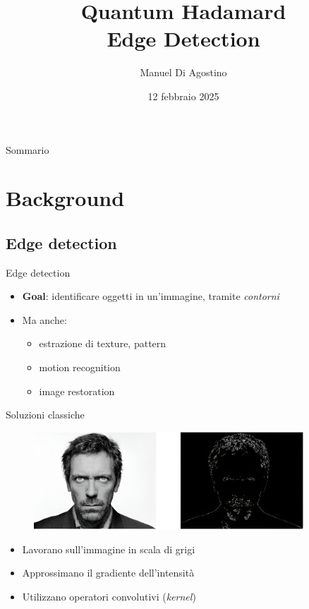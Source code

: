 \documentclass{beamer}
\title{Quantum Hadamard\\Edge Detection}
\author{Manuel Di Agostino}
\institute{Università di Parma}
\date{12 febbraio 2025}
\begin{document}
	\begin{frame}
		\titlepage
	\end{frame}
	\begin{frame}{Sommario}
		\tableofcontents
	\end{frame}
	
	\section{Background}


	\subsection{Edge detection}

	\begin{frame}{Edge detection}
		\begin{itemize}
			\item \textbf{Goal}: identificare oggetti in un'immagine, tramite
			\emph{contorni}
			\item Ma anche:
				\begin{itemize}
					\item estrazione di texture, pattern
					\item motion recognition
					\item image restoration
				\end{itemize}
		\end{itemize}
	\end{frame}

	\begin{frame}{Soluzioni classiche}
		\begin{figure}
			\includegraphics[width=0.9\textwidth]{edge-detection-example.png}
		\end{figure}

		\begin{itemize}
			\item Lavorano sull'immagine in scala di grigi
			\item Approssimano il gradiente dell'intensità
			\item Utilizzano operatori convolutivi (\emph{kernel})
		\end{itemize}
	\end{frame}
\end{document}
